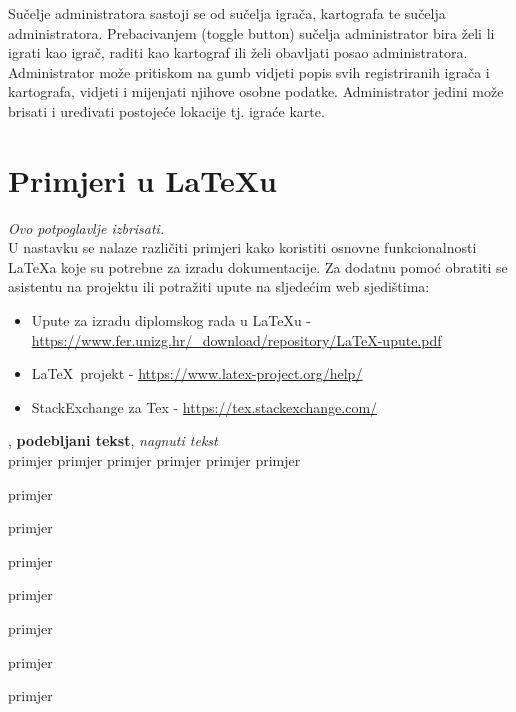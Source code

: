 		\textnormal{Sučelje administratora sastoji se od sučelja igrača, kartografa te sučelja administratora. Prebacivanjem (toggle button) sučelja administrator bira želi li igrati kao igrač, raditi kao kartograf ili želi obavljati posao administratora. Administrator može pritiskom na gumb vidjeti popis svih registriranih igrača i kartografa, vidjeti i mijenjati njihove osobne podatke. Administrator jedini može brisati i uređivati postojeće lokacije tj. igraće karte.}
	
		\eject
		
		\section{Primjeri u \LaTeX u}
		
		\textit{Ovo potpoglavlje izbrisati.}\\

		U nastavku se nalaze različiti primjeri kako koristiti osnovne funkcionalnosti \LaTeX a koje su potrebne za izradu dokumentacije. Za dodatnu pomoć obratiti se asistentu na projektu ili potražiti upute na sljedećim web sjedištima:
		\begin{itemize}
			\item Upute za izradu diplomskog rada u \LaTeX u - \url{https://www.fer.unizg.hr/_download/repository/LaTeX-upute.pdf}
			\item \LaTeX\ projekt - \url{https://www.latex-project.org/help/}
			\item StackExchange za Tex - \url{https://tex.stackexchange.com/}\\
		
		\end{itemize} 	


		
		\noindent {}, \textbf{podebljani tekst}, 	\textit{nagnuti tekst}\\
		\noindent \normalsize primjer \large primjer \Large primjer \LARGE {primjer} \huge {primjer} \Huge primjer \normalsize
				
		\begin{packed_item}
			
			\item  primjer
			\item  primjer
			\item  primjer
			\item[] \begin{packed_enum}
				\item primjer
				\item[] \begin{packed_enum}
					\item[1.a] primjer
					\item[b] primjer
				\end{packed_enum}
				\item primjer
			\end{packed_enum}
			
		\end{packed_item}
		
